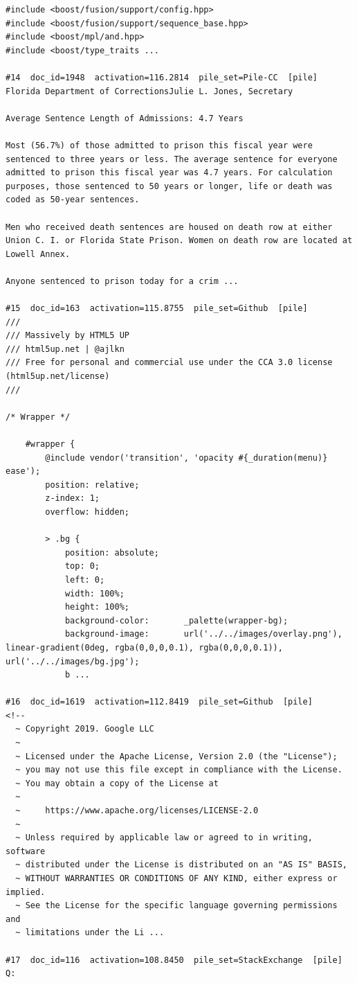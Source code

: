\begin{verbatim}
#include <boost/fusion/support/config.hpp>
#include <boost/fusion/support/sequence_base.hpp>
#include <boost/mpl/and.hpp>
#include <boost/type_traits ...

#14  doc_id=1948  activation=116.2814  pile_set=Pile-CC  [pile]
Florida Department of CorrectionsJulie L. Jones, Secretary

Average Sentence Length of Admissions: 4.7 Years

Most (56.7%) of those admitted to prison this fiscal year were sentenced to three years or less. The average sentence for everyone admitted to prison this fiscal year was 4.7 years. For calculation purposes, those sentenced to 50 years or longer, life or death was coded as 50-year sentences.

Men who received death sentences are housed on death row at either Union C. I. or Florida State Prison. Women on death row are located at Lowell Annex.

Anyone sentenced to prison today for a crim ...

#15  doc_id=163  activation=115.8755  pile_set=Github  [pile]
///
/// Massively by HTML5 UP
/// html5up.net | @ajlkn
/// Free for personal and commercial use under the CCA 3.0 license (html5up.net/license)
///

/* Wrapper */

	#wrapper {
		@include vendor('transition', 'opacity #{_duration(menu)} ease');
		position: relative;
		z-index: 1;
		overflow: hidden;

		> .bg {
			position: absolute;
			top: 0;
			left: 0;
			width: 100%;
			height: 100%;
			background-color:		_palette(wrapper-bg);
			background-image:		url('../../images/overlay.png'),	linear-gradient(0deg, rgba(0,0,0,0.1), rgba(0,0,0,0.1)),	url('../../images/bg.jpg');
			b ...

#16  doc_id=1619  activation=112.8419  pile_set=Github  [pile]
<!--
  ~ Copyright 2019. Google LLC
  ~
  ~ Licensed under the Apache License, Version 2.0 (the "License");
  ~ you may not use this file except in compliance with the License.
  ~ You may obtain a copy of the License at
  ~
  ~     https://www.apache.org/licenses/LICENSE-2.0
  ~
  ~ Unless required by applicable law or agreed to in writing, software
  ~ distributed under the License is distributed on an "AS IS" BASIS,
  ~ WITHOUT WARRANTIES OR CONDITIONS OF ANY KIND, either express or implied.
  ~ See the License for the specific language governing permissions and
  ~ limitations under the Li ...

#17  doc_id=116  activation=108.8450  pile_set=StackExchange  [pile]
Q:


\end{verbatim}
